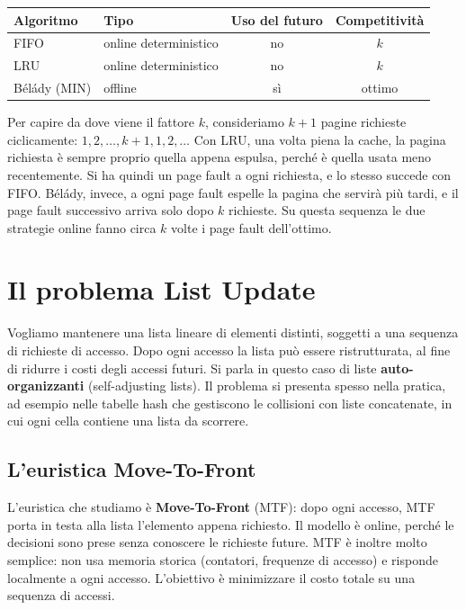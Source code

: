 \begin{center}
\small
\begin{tabular}{llcc}
\toprule
Algoritmo & Tipo & Uso del futuro & Competitività \\
\midrule
FIFO & online deterministico & no & $k$ \\
LRU & online deterministico & no & $k$ \\
Bélády (MIN) & offline & sì & ottimo \\
\bottomrule
\end{tabular}
\end{center}

Per capire da dove viene il fattore $k$, consideriamo $k+1$ pagine richieste ciclicamente: $1, 2, \dots, k+1, 1, 2, \dots$ Con LRU, una volta piena la cache, la pagina richiesta è sempre proprio quella appena espulsa, perché è quella usata meno recentemente. Si ha quindi un page fault a ogni richiesta, e lo stesso succede con FIFO. Bélády, invece, a ogni page fault espelle la pagina che servirà più tardi, e il page fault successivo arriva solo dopo $k$ richieste. Su questa sequenza le due strategie online fanno circa $k$ volte i page fault dell'ottimo.

\section{Il problema List Update}\label{sec:list-update}
Vogliamo mantenere una lista lineare di elementi distinti, soggetti a una sequenza di richieste di accesso. Dopo ogni accesso la lista può essere ristrutturata, al fine di ridurre i costi degli accessi futuri. Si parla in questo caso di liste \textbf{auto-organizzanti} (self-adjusting lists). Il problema si presenta spesso nella pratica, ad esempio nelle tabelle hash che gestiscono le collisioni con liste concatenate, in cui ogni cella contiene una lista da scorrere.

\subsection{L'euristica Move-To-Front}\label{sec:mtf}
L'euristica che studiamo è \textbf{Move-To-Front} (MTF): dopo ogni accesso, MTF porta in testa alla lista l'elemento appena richiesto. Il modello è online, perché le decisioni sono prese senza conoscere le richieste future. MTF è inoltre molto semplice: non usa memoria storica (contatori, frequenze di accesso) e risponde localmente a ogni accesso. L'obiettivo è minimizzare il costo totale su una sequenza di accessi.

